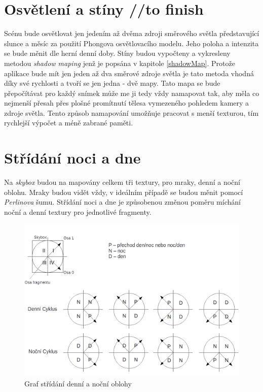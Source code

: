 \section{Osvětlení a stíny //to finish}
Scénu bude osvětlovat jen jedením až dvěma  zdroji směrového světla představující slunce a měsíc za použití Phongova osvětlovacího modelu. Jeho poloha a intenzita se bude měnit dle herní denní doby.   
Stíny budou vypočteny a vykresleny metodou \emph{shadow maping }jenž je popsána v kapitole \ref{shadowMap}. Protože aplikace bude mít jen jeden až dva směrové zdroje světla je tato metoda vhodná díky své rychlosti a tvoří se jen jedna - dvě mapy. Tato mapa se bude přepočítávat pro každý snímek může me ji tedy vždy namapovat tak, aby měla co nejmenší přesah přes plošné promítnutí tělesa vymezeného pohledem kamery a zdroje světla. Tento způsob namapování umožňuje pracovat s menší texturou, tím rychlejší výpočet a méně zabrané paměti. 
\section{Střídání noci a dne}
Na \emph{skybox} budou na mapovány celkem tři textury, pro mraky, denní a noční oblohu. Mraky budou vidět vždy, v ideálním případě se budou měnit pomocí \emph{Perlinova} šumu. Střídání noci a dne je způsobenou změnou poměru míchání noční a denní textury pro jednotlivé fragmenty.

    \begin{figure}
    	\begin{center}
    		\includegraphics[scale=0.35]{obrazky-figures/dayOnight}
    		\caption{Graf střídání denní a noční oblohy}\label{dayOnight}
    \end{center}\end{figure}

